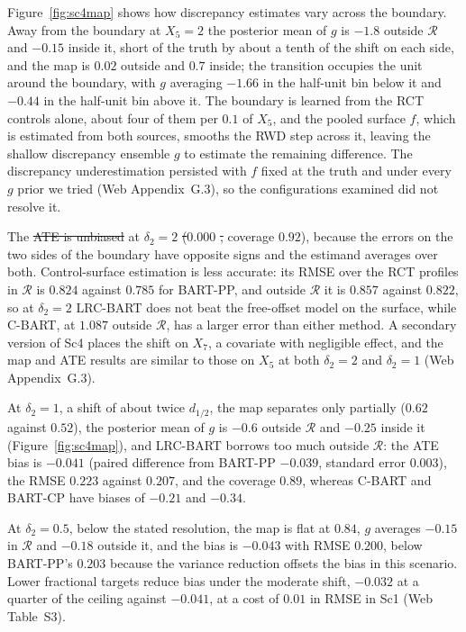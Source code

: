 \documentclass[11pt]{article}
\theoremstyle{definition}
\theoremstyle{plain}
\providecommand{\DIFaddtex}[1]{{\protect\color{blue}\uwave{#1}}} %
\providecommand{\DIFdeltex}[1]{{\protect\color{red}\sout{#1}}}                      %
\providecommand{\DIFaddbegin}{} %
\providecommand{\DIFaddend}{} %
\providecommand{\DIFdelbegin}{} %
\providecommand{\DIFdelend}{} %
\providecommand{\DIFadd}[1]{\texorpdfstring{\DIFaddtex{#1}}{#1}} %
\providecommand{\DIFdel}[1]{\texorpdfstring{\DIFdeltex{#1}}{}} %
\newcommand{\DIFscaledelfig}{0.5}
\newlength{\DIFdelgraphicswidth} %
\newlength{\DIFdelgraphicsheight} %
\newcommand{\DIFaddincludegraphics}[2][]{{\color{blue}\fbox{\DIFOincludegraphics[#1]{#2}}}} %
\newcommand{\DIFdelincludegraphics}[2][]{%
\sbox{\DIFdelgraphicsbox}{\DIFOincludegraphics[#1]{#2}}%
\settoboxwidth{\DIFdelgraphicswidth}{\DIFdelgraphicsbox} %
\settoboxtotalheight{\DIFdelgraphicsheight}{\DIFdelgraphicsbox} %
\scalebox{\DIFscaledelfig}{%
\parbox[b]{\DIFdelgraphicswidth}{\usebox{\DIFdelgraphicsbox}\\[-\baselineskip] \rule{\DIFdelgraphicswidth}{0em}}\llap{\resizebox{\DIFdelgraphicswidth}{\DIFdelgraphicsheight}{%
\setlength{\unitlength}{\DIFdelgraphicswidth}%
\begin{picture}(1,1)%
\thicklines\linethickness{2pt} %
{\color[rgb]{1,0,0}\put(0,0){\framebox(1,1){}}}%
{\color[rgb]{1,0,0}\put(0,0){\line( 1,1){1}}}%
{\color[rgb]{1,0,0}\put(0,1){\line(1,-1){1}}}%
\end{picture}%
}\hspace*{3pt}}} %
} %
\DeclareRobustCommand{\DIFaddbegin}{\DIFOaddbegin \let\includegraphics\DIFaddincludegraphics} %
\DeclareRobustCommand{\DIFaddend}{\DIFOaddend \let\includegraphics\DIFOincludegraphics} %
\DeclareRobustCommand{\DIFdelbegin}{\DIFOdelbegin \let\includegraphics\DIFdelincludegraphics} %
\DeclareRobustCommand{\DIFdelend}{\DIFOaddend \let\includegraphics\DIFOincludegraphics} %
\begin{document}
Figure~\ref{fig:sc4map} shows how discrepancy estimates vary across the boundary. Away from the boundary at $X_5=2$ the posterior mean of $g$ is $-1.8$ outside $\mathcal R$ and $-0.15$ inside it, short of the truth by about a tenth of the shift on each side, and the map is $0.02$ outside and $0.7$ inside; the transition occupies the unit around the boundary, with $g$ averaging $-1.66$ in the half-unit bin below it and $-0.44$ in the half-unit bin above it. The boundary is learned from the RCT controls alone, about four of them per $0.1$ of $X_5$, and the pooled surface $f$, which is estimated from both sources, smooths the RWD step across it, leaving the shallow discrepancy ensemble $g$ to estimate the remaining difference. The discrepancy underestimation persisted with $f$ fixed at the truth and under every $g$ prior we tried (Web Appendix~G.3), so the configurations examined did not resolve it.

The \DIFdelbegin \DIFdel{ATE is unbiased }\DIFdelend \DIFaddbegin \DIFadd{empirical ATE bias }\DIFaddend at $\delta_2=2$ \DIFdelbegin \DIFdel{(}\DIFdelend \DIFaddbegin \DIFadd{is }\DIFaddend $0.000$ \DIFdelbegin \DIFdel{, }\DIFdelend \DIFaddbegin \DIFadd{(}\DIFaddend coverage $0.92$), because the errors on the two sides of the boundary have opposite signs and the estimand averages over both. Control-surface estimation is less accurate: its RMSE over the RCT profiles in $\mathcal R$ is $0.824$ against $0.785$ for BART-PP, and outside $\mathcal R$ it is $0.857$ against $0.822$, so at $\delta_2=2$ LRC-BART does not beat the free-offset model on the surface, while C-BART, at $1.087$ outside $\mathcal R$, has a larger error than either method. A secondary version of Sc4 places the shift on $X_7$, a covariate with negligible effect, and the map and ATE results are similar to those on $X_5$ at both $\delta_2=2$ and $\delta_2=1$ (Web Appendix~G.3).

At $\delta_2=1$, a shift of about twice $d_{1/2}$, the map separates only partially ($0.62$ against $0.52$), the posterior mean of $g$ is $-0.6$ outside $\mathcal R$ and $-0.25$ inside it (Figure~\ref{fig:sc4map}), and LRC-BART borrows too much outside $\mathcal R$: the ATE bias is $-0.041$ (paired difference from BART-PP $-0.039$, standard error $0.003$), the RMSE $0.223$ against $0.207$, and the coverage $0.89$, whereas C-BART and BART-CP have biases of $-0.21$ and $-0.34$.

At $\delta_2=0.5$, below the stated resolution, the map is flat at $0.84$, $g$ averages $-0.15$ in $\mathcal R$ and $-0.18$ outside it, and the bias is $-0.043$ with RMSE $0.200$, below BART-PP's $0.203$ because the variance reduction offsets the bias in this scenario. Lower fractional targets reduce bias under the moderate shift, $-0.032$ at a quarter of the ceiling against $-0.041$, at a cost of $0.01$ in RMSE in Sc1 (Web Table~S3).
\end{document}
